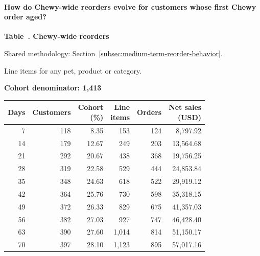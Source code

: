 \paragraph{How do Chewy-wide reorders evolve for customers whose first Chewy order aged?}

\label{tab:financial-opportunity-new-chewy-all-chewy}
\par\smallskip\noindent\parbox[t][2\baselineskip][t]{\linewidth}{\raggedright\textbf{Table~\thetable. Chewy-wide reorders}}
\par\raggedright\footnotesize Shared methodology: Section~\ref{subsec:medium-term-reorder-behavior}.
\par\noindent\parbox[t][2\baselineskip][t]{\linewidth}{\raggedright Line items for any pet, product or category.}
\par\noindent\textbf{Cohort denominator: 1,413}
\par\centering\footnotesize
\setlength{\tabcolsep}{2pt}
\begin{tabular}{rrrrrr}\toprule
Days & Customers & \shortstack{Cohort\\(\%)} & \shortstack{Line\\items} & Orders & \shortstack{Net sales\\(USD)} \\ \midrule

7 & 118 & 8.35 & 153 & 124 & 8,797.92 \\

14 & 179 & 12.67 & 249 & 203 & 13,564.68 \\

21 & 292 & 20.67 & 438 & 368 & 19,756.25 \\

28 & 319 & 22.58 & 529 & 444 & 24,853.84 \\

35 & 348 & 24.63 & 618 & 522 & 29,919.12 \\

42 & 364 & 25.76 & 730 & 598 & 35,318.15 \\

49 & 372 & 26.33 & 829 & 675 & 41,357.03 \\

56 & 382 & 27.03 & 927 & 747 & 46,428.40 \\

63 & 390 & 27.60 & 1,014 & 814 & 51,150.17 \\

70 & 397 & 28.10 & 1,123 & 895 & 57,017.16 \\
\bottomrule\end{tabular}\par

